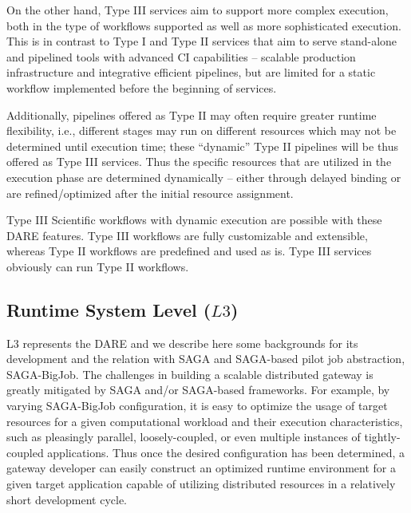 \documentclass[]{svjour3}
\begin{document}
On the other hand, Type III services aim to support more complex
execution, both in the type of workflows supported as well as more
sophisticated execution. This is in contrast to Type I and Type II
services that aim to serve stand-alone and pipelined tools with advanced CI
capabilities -- scalable production infrastructure and integrative
efficient pipelines, but are limited for a static workflow implemented before the beginning of services.

Additionally, pipelines offered as Type II may often require greater
runtime flexibility, i.e., different stages may run on different
resources which may not be determined until execution time; these
``dynamic'' Type II pipelines will be thus offered as Type III
services. Thus the specific resources that are utilized in the
execution phase are determined dynamically -- either through delayed binding
or are refined/optimized after the initial resource assignment.

Type III Scientific workflows with dynamic execution are possible
with these DARE features. Type III workflows are fully customizable
and extensible, whereas Type II workflows are predefined and used as is.
Type III services obviously can run Type II workflows.


\subsection{Runtime System Level ($L3$)}
L3 represents the DARE and we describe here some backgrounds for its development and the relation with SAGA and SAGA-based pilot job abstraction, SAGA-BigJob. The challenges in building a scalable
distributed gateway is greatly mitigated by SAGA and/or SAGA-based
frameworks. For example, by varying SAGA-BigJob configuration, it is
easy to optimize the usage of target resources for a given
computational workload and their execution characteristics, such as
pleasingly parallel, loosely-coupled, or even multiple instances of
tightly-coupled applications. Thus once the desired configuration
has been determined, a gateway developer can easily construct
an optimized runtime environment for a given target application capable
of utilizing distributed resources in a relatively short development
cycle.
\end{document}
